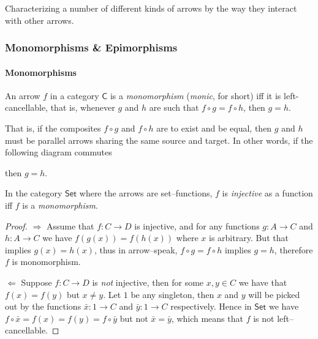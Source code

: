 Characterizing a number of different kinds of arrows by the way they interact with other arrows.


\subsubsection{Monomorphisms \& Epimorphisms}


\paragraph{Monomorphisms}


\begin{df}[Monomorphisms]
	An arrow $f$ in a category $\mathsf{C}$ is a \textit{monomorphism} (\textit{monic}, for short) iff it is {\color{teal} left-cancellable}, 
	that is, 
	whenever $g$ and $h$ are such that $f \circ g = f \circ h$, 
	then $g = h$.  
\end{df}


That is, 
if the composites $f \circ g$ and $f \circ h$ are to exist and be equal, 
then $g$ and $h$ must be parallel arrows sharing the same source and target. 
% 
In other words, 
if the following diagram commutes
% 
\begin{center}
\end{center}
% 
then $g=h$.



\begin{prop}
	In the category $\mathsf{Set}$  where the arrows are set--functions, 
	$f$ is \textit{injective} as a function 
	iff
	$f$ is a \textit{monomorphism}.
\end{prop}
\begin{proof}
	\qquad

	$\Rightarrow$ \quad
	Assume that $f \colon C \to D$ is injective, 
	and for any functions $g \colon A \to C$ and $h \colon A \to C$ we have $f(g(x)) = f(h(x))$ where $x$ is arbitrary. 
	But that implies $g(x) = h(x)$, 
	thus in arrow--speak, 
	$f \circ g = f \circ h$ implies $g = h$, 
	therefore $f$ is monomorphism. 


	$\Leftarrow$ \quad
	Suppose $f \colon C \to D$ is \textit{not} injective, 
	then for some $x,y \in C$ we have that $f(x)=f(y)$ but $x \not=y$.
	Let $1$ be any singleton, 
	then $x$ and $y$ will be picked out by the functions $\bar{x} \colon 1 \to C$ and $\bar{y} \colon 1 \to C$ respectively. 
	Hence in $\mathsf{Set}$ we have $f \circ \bar{x} = f(x) = f(y) = f \circ \bar{y}$ but not $\bar{x} = \bar{y}$, 
	which means that $f$ is not left--cancellable.
\end{proof}




